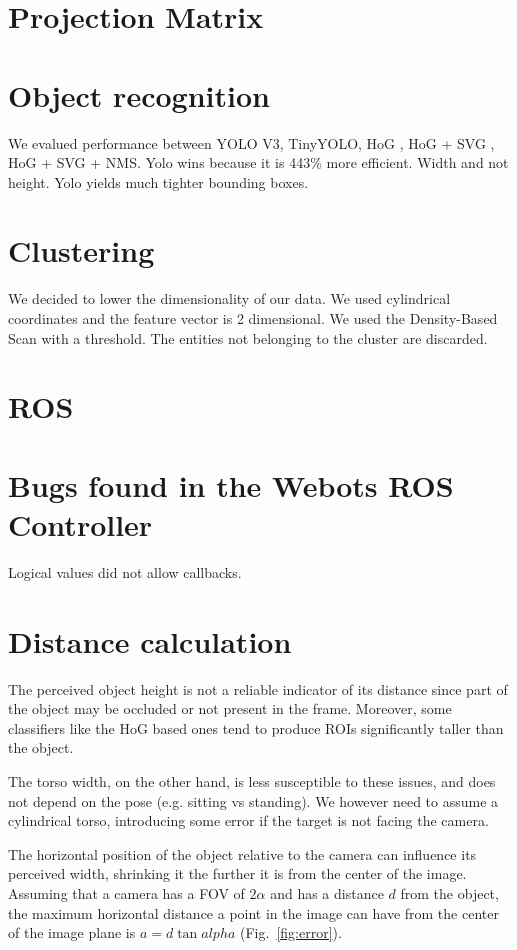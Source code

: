 \documentclass[a4paper]{article}
\begin{document}
	\section{Projection Matrix}
	\cite{OpenGL}
	
	\section{Object recognition}
	We evalued performance between YOLO V3, TinyYOLO, HoG , HoG + SVG  , HoG + SVG + NMS. Yolo wins because it is 443\% more efficient. Width and not height. Yolo yields much tighter bounding boxes. 
	
	\section{Clustering}
	We decided to lower the dimensionality of our data. We used cylindrical coordinates and the feature vector is 2 dimensional.
	We used the Density-Based Scan with a threshold. The entities not belonging to the cluster are discarded.
	
	\section{ROS}
	
	\section{Bugs found in the Webots ROS Controller}
	Logical values did not allow callbacks.
	

	\section{Distance calculation}\label{sec:Distance-calculation}
	The perceived object height is not a reliable indicator of its distance
	since part of the object may be occluded or not present in the frame.
	Moreover, some classifiers like the HoG based ones tend to produce ROIs
	significantly taller than the object.
	
	The torso width, on the other hand, is less susceptible to these issues,
	and does not depend on the pose (e.g. sitting vs standing). We however need
	to assume a cylindrical torso, introducing some error if the target is not
	facing the camera.

	The horizontal position of the object relative to the camera can influence
	its perceived width, shrinking it the further it is from the center of the
	image.  Assuming that a camera has a FOV of $2\alpha$ and has a distance
	$d$ from the object, the maximum horizontal distance a point in the image
	can have from the center of the image plane is $a = d \tan alpha$
	(Fig.~\ref{fig:error}).
\end{document}
